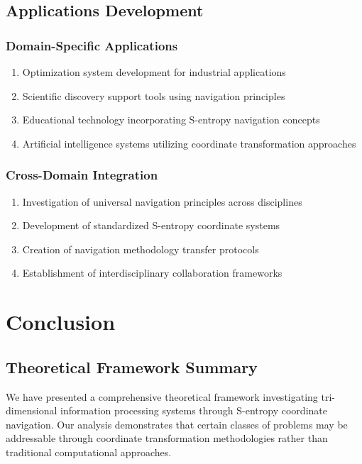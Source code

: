 \documentclass[12pt,a4paper]{article}
\begin{document}
\subsection{Applications Development}

\subsubsection{Domain-Specific Applications}

\begin{enumerate}
\item Optimization system development for industrial applications
\item Scientific discovery support tools using navigation principles
\item Educational technology incorporating S-entropy navigation concepts
\item Artificial intelligence systems utilizing coordinate transformation approaches
\end{enumerate}

\subsubsection{Cross-Domain Integration}

\begin{enumerate}
\item Investigation of universal navigation principles across disciplines
\item Development of standardized S-entropy coordinate systems
\item Creation of navigation methodology transfer protocols
\item Establishment of interdisciplinary collaboration frameworks
\end{enumerate}

\section{Conclusion}

\subsection{Theoretical Framework Summary}

We have presented a comprehensive theoretical framework investigating tri-dimensional information processing systems through S-entropy coordinate navigation. Our analysis demonstrates that certain classes of problems may be addressable through coordinate transformation methodologies rather than traditional computational approaches.
\end{document}
